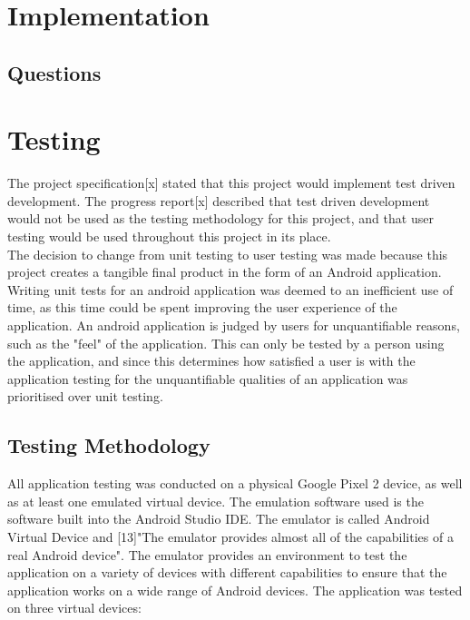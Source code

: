 \documentclass{article}
\begin{document}
\section{Implementation}
\label{section:implementation}

%
%

\subsection{Questions}

%
%

\section{Testing}
\label{section:testing}

The project specification[x] stated that this project would implement test driven development. The progress report[x] described that test driven development would not be used as the testing methodology for this project, and that user testing would be used throughout this project in its place. \\

The decision to change from unit testing to user testing was made because this project creates a tangible final product in the form of an Android application. Writing unit tests for an android application was deemed to an inefficient use of time, as this time could be spent improving the user experience of the application. An android application is judged by users for unquantifiable reasons, such as the "feel" of the application. This can only be tested by a person using the application, and since this determines how satisfied a user is with the application testing for the unquantifiable qualities of an application was prioritised over unit testing. \\

\subsection{Testing Methodology}

All application testing was conducted on a physical Google Pixel 2 device, as well as at least one emulated virtual device. The emulation software used is the software built into the Android Studio IDE. The emulator is called Android Virtual Device and [13]"The emulator provides almost all of the capabilities of a real Android device". The emulator provides an environment to test the application on a variety of devices with different capabilities to ensure that the application works on a wide range of Android devices. The application was tested on three virtual devices: 
\end{document}
